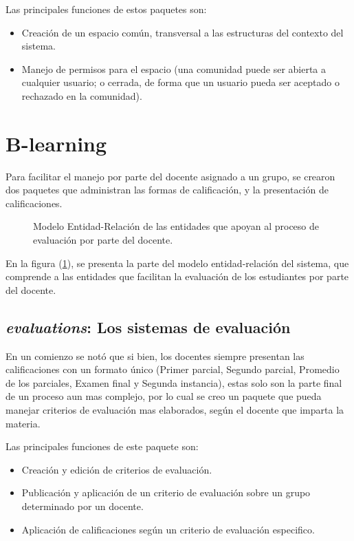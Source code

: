 Las principales funciones de estos paquetes son:

\begin{itemize}
\item Creación de un espacio común, transversal a las estructuras del contexto
del sistema.
\item Manejo de permisos para el espacio (una comunidad puede ser abierta a
cualquier usuario; o cerrada, de forma que un usuario pueda ser aceptado o
rechazado en la comunidad).
\end{itemize}

\section{B-learning}
Para facilitar el manejo por parte del docente asignado a un grupo, se crearon
dos paquetes que administran las formas de calificación, y la presentación de
calificaciones.

\begin{figure}
\centering

\caption{Modelo Entidad-Relación de las entidades que apoyan al proceso de
evaluación por parte del docente.}
\label{modelo3}
\end{figure}

En la figura (\ref{modelo3}), se presenta la parte del modelo entidad-relación
del sistema, que comprende a las entidades que facilitan la evaluación de los
estudiantes por parte del docente.

\subsection{\emph{evaluations}: Los sistemas de evaluación}
En un comienzo se notó que si bien, los docentes siempre presentan las
calificaciones con un formato único (Primer parcial, Segundo parcial, Promedio
de los parciales, Examen final y Segunda instancia), estas solo son la parte
final de un proceso aun mas complejo, por lo cual se creo un paquete que pueda
manejar criterios de evaluación mas elaborados, según el docente que imparta la
materia.

Las principales funciones de este paquete son:

\begin{itemize}
\item Creación y edición de criterios de evaluación.
\item Publicación y aplicación de un criterio de evaluación sobre un grupo
determinado por un docente.
\item Aplicación de calificaciones según un criterio de evaluación especifico.
\end{itemize}

